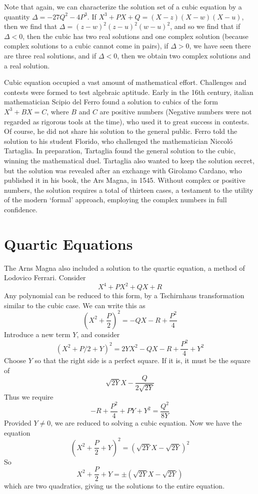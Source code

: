 Note that again, we can characterize the solution set of a cubic equation by a quantity $\Delta = -27Q^2 - 4P^3$. If $X^3 + PX + Q = (X - z)(X - w)(X - u)$, then we find that $\Delta = (z - w)^2(z - u)^2(w-u)^2$, and so we find that if $\Delta < 0$, then the cubic has two real solutions and one complex solution (because complex solutions to a cubic cannot come in pairs), if $\Delta > 0$, we have seen there are three real solutions, and if $\Delta < 0$, then we obtain two complex solutions and a real solution.

Cubic equation occupied a vast amount of mathematical effort. Challenges and contests were formed to test algebraic aptitude. Early in the 16th century, italian mathematician Scipio del Ferro found a solution to cubics of the form $X^3 + BX = C$, where $B$ and $C$ are positive numbers (Negative numbers were not regarded as rigorous tools at the time), who used it to great success in contests. Of course, he did not share his solution to the general public. Ferro told the solution to his student Florido, who challenged the mathematician Niccol\'{o} Tartaglia. In preparation, Tartaglia found the general solution to the cubic, winning the mathematical duel. Tartaglia also wanted to keep the solution secret, but the solution was revealed after an exchange with Girolamo Cardano, who published it in his book, the Ars Magna, in 1545. Without complex or positive numbers, the solution requires a total of thirteen cases, a testament to the utility of the modern `formal' approach, employing the complex numbers in full confidence.

\section{Quartic Equations}

The Arns Magna also included a solution to the quartic equation, a method of Lodovico Ferrari. Consider
%
\[ X^4 + PX^2 + QX + R \]
%
Any polynomial can be reduced to this form, by a Tschirnhaus transformation similar to the cubic case. We can write this as
%
\[ (X^2 + \frac{P}{2})^2 = -QX - R + \frac{P^2}{4} \]
%
Introduce a new term $Y$, and consider
%
\[ (X^2 + P/2 + Y)^2 = 2YX^2 - QX - R + \frac{P^2}{4} + Y^2 \]
%
Choose $Y$ so that the right side is a perfect square. If it is, it must be the square of
%
\[ \sqrt{2Y}X - \frac{Q}{2\sqrt{2Y}} \]
%
Thus we require
%
\[ -R + \frac{P^2}{4} + PY + Y^2 = \frac{Q^2}{8Y} \]
%
Provided $Y \neq 0$, we are reduced to solving a cubic equation. Now we have the equation
%
\[ (X^2 + \frac{P}{2} + Y)^2 = (\sqrt{2Y}X - \sqrt{2Y})^2 \]
%
So
%
\[ X^2 + \frac{P}{2} + Y = \pm(\sqrt{2Y}X - \sqrt{2Y}) \]
%
which are two quadratics, giving us the solutions to the entire equation.

